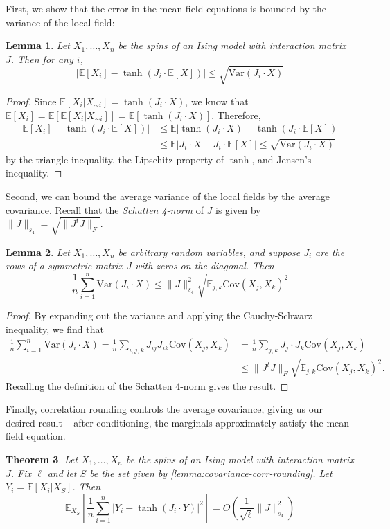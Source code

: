 \documentclass[11pt, oneside, english]{article}
\newcommand{\bE}{\mathbb{E}}
\newcommand{\Cov}{\mathrm{Cov}}
\newcommand{\Var}{\mathrm{Var}}
\newcommand{\E}{\bE}      %
\newtheorem{theorem}{Theorem}[section]
\newtheorem{lemma}[theorem]{Lemma}
\theoremstyle{definition}
\theoremstyle{plain}
\begin{document}
First, we show that the error in the mean-field equations is bounded by the variance of the local field:
\begin{lemma}\label{lem:mean-field-local-field}
Let $X_1, \ldots, X_n$ be the spins of an Ising model with interaction matrix $J$. Then for any $i$,
\[ |\E[X_i] - \tanh(J_i \cdot \E[X])| \le \sqrt{\Var(J_i \cdot X)} \]
\end{lemma}
\begin{proof}
Since $\E[X_i | X_{\sim i}] = \tanh(J_i \cdot X)$, we know that  $\E[X_i] = \E[\E[X_i | X_{\sim i}]] = \E[\tanh(J_i \cdot X)]$. Therefore,
\begin{align*}
\left|\E[X_i] - \tanh(J_i \cdot \E[X])\right| &\le \E\left|\tanh(J_i \cdot X) - \tanh(J_i \cdot \E[X])\right| \\ 
&\le \E \left|J_i \cdot X - J_i \cdot \E[X]\right| \le \sqrt{\Var(J_i \cdot X)}
\end{align*}
by the triangle inequality, the Lipschitz property of $\tanh$, and Jensen's inequality. 
\end{proof}
Second, we can bound the average variance of the local fields by the average covariance. Recall that the \emph{Schatten 4-norm} of $J$ is given by $\|J\|_{s_4} = \sqrt{\|J^t J\|_F}$.
\begin{lemma}\label{lem:local-field-bound}
Let $X_1, \ldots, X_n$ be arbitrary random variables, and suppose $J_i$ are the rows of a symmetric matrix $J$ with zeros on the diagonal. Then
\[ \frac{1}{n} \sum_{i = 1}^n \Var(J_i \cdot X) \le \|J\|_{s_4}^2 \sqrt{\E_{j,k} \Cov(X_j,X_k)^2} \]
\end{lemma}
\begin{proof}
By expanding out the variance and applying the Cauchy-Schwarz inequality, we find that
\begin{align*}
\frac{1}{n} \sum_{i = 1}^n \Var(J_i \cdot X) 
= \frac{1}{n} \sum_{i,j,k} J_{ij} J_{ik} \Cov(X_j, X_k)
&= \frac{1}{n} \sum_{j,k} J_j \cdot J_k \Cov(X_j,X_k) \\
&\le \|J^t J\|_F \sqrt{\E_{j,k} \Cov(X_j,X_k)^2}.
\end{align*}
Recalling the definition of the Schatten 4-norm gives the result.
\end{proof}
Finally, correlation rounding controls the average covariance, giving us our desired result -- after conditioning, the marginals approximately satisfy the mean-field equation.
\begin{theorem}
Let $X_1,\ldots,X_n$ be the spins of an Ising model with interaction matrix $J$. Fix $\ell$ and let $S$ be the set given by \cref{lemma:covariance-corr-rounding}. Let $Y_i = \E[X_i | X_S]$. Then
\[ \E_{X_S}\left[\frac{1}{n} \sum_{i = 1}^n |Y_i - \tanh(J_i \cdot Y)|^2 \right] = O\left(\frac{1}{\sqrt{\ell}} \|J\|_{s_4}^2\right)\]
\end{theorem}
\end{document}
